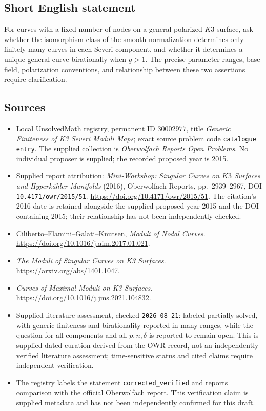 \documentclass[11pt]{article}
\begin{document}
\subsection{Short English statement}
For curves with a fixed number of nodes on a general polarized \(K3\) surface, ask whether the isomorphism class of the smooth normalization determines only finitely many curves in each Severi component, and whether it determines a unique general curve birationally when \(g>1\). The precise parameter ranges, base field, polarization conventions, and relationship between these two assertions require clarification.
\subsection{Sources}
\begin{itemize}
\item Local UnsolvedMath registry, permanent ID \(30002977\), title \emph{Generic Finiteness of K3 Severi Moduli Maps}; exact source problem code \texttt{catalogue entry}. The supplied collection is \emph{Oberwolfach Reports Open Problems}. No individual proposer is supplied; the recorded proposed year is 2015.
\item Supplied report attribution: \emph{Mini-Workshop: Singular Curves on \(K3\) Surfaces and Hyperkähler Manifolds} (2016), Oberwolfach Reports, pp.~2939--2967, DOI \texttt{10.4171/owr/2015/51}. \url{https://doi.org/10.4171/owr/2015/51}. The citation's 2016 date is retained alongside the supplied proposed year 2015 and the DOI containing 2015; their relationship has not been independently checked.
\item Ciliberto--Flamini--Galati--Knutsen, \emph{Moduli of Nodal Curves}. \url{https://doi.org/10.1016/j.aim.2017.01.021}.
\item \emph{The Moduli of Singular Curves on K3 Surfaces}. \url{https://arxiv.org/abs/1401.1047}.
\item \emph{Curves of Maximal Moduli on K3 Surfaces}. \url{https://doi.org/10.1016/j.jms.2021.104832}.
\item Supplied literature assessment, checked \texttt{2026-08-21}: labeled partially solved, with generic finiteness and birationality reported in many ranges, while the question for all components and all \(p,n,\delta\) is reported to remain open. This is supplied dated curation derived from the OWR record, not an independently verified literature assessment; time-sensitive status and cited claims require independent verification.
\item The registry labels the statement \texttt{corrected\_verified} and reports comparison with the official Oberwolfach report. This verification claim is supplied metadata and has not been independently confirmed for this draft.
\end{itemize}
\end{document}
